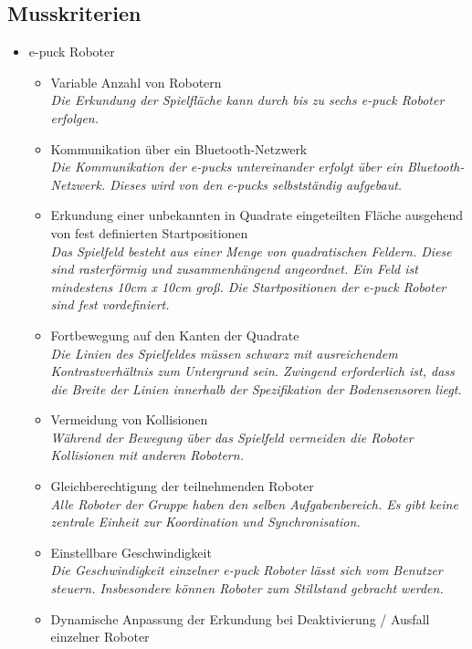 \documentclass[10pt,a4paper]{article}
\begin{document}
		\subsection{Musskriterien}
			\begin{itemize}
				\item e-puck Roboter
				\begin{itemize}
					\item Variable Anzahl von Robotern
						\\ \textsl{Die Erkundung der Spielfläche kann durch bis zu sechs e-puck Roboter erfolgen.}
					\item Kommunikation über ein Bluetooth-Netzwerk
						\\ \textsl{Die Kommunikation der e-pucks untereinander erfolgt über ein Bluetooth-Netzwerk.
						   Dieses wird von den e-pucks selbstständig aufgebaut.}
					\item Erkundung einer unbekannten in Quadrate eingeteilten Fläche ausgehend von fest definierten Startpositionen
						\\ \textsl{Das Spielfeld besteht aus einer Menge von quadratischen \gls{Feld}ern. Diese sind rasterförmig
							und zusammenhängend angeordnet. Ein Feld ist mindestens 10cm x 10cm groß. Die Startpositionen der e-puck Roboter
						   sind fest vordefiniert.}
					\item Fortbewegung auf den Kanten der Quadrate
						\\ \textsl{Die Linien des Spielfeldes müssen schwarz mit ausreichendem Kontrastverhältnis
						    zum Untergrund sein. Zwingend erforderlich ist, dass die Breite der Linien innerhalb der Spezifikation der
							Bodensensoren liegt.}		
					\item Vermeidung von Kollisionen
						\\ \textsl{Während der Bewegung über das Spielfeld vermeiden die Roboter Kollisionen mit anderen Robotern.}	
					\item Gleichberechtigung der teilnehmenden Roboter
						\\ \textsl{Alle Roboter der Gruppe haben den selben Aufgabenbereich. Es gibt keine zentrale Einheit
							zur Koordination und Synchronisation.}	
					\item Einstellbare Geschwindigkeit
						\\ \textsl{Die Geschwindigkeit einzelner e-puck Roboter lässt sich vom Benutzer steuern. Insbesondere können Roboter
							zum Stillstand gebracht werden.}
					\item Dynamische Anpassung der Erkundung bei Deaktivierung / Ausfall einzelner Roboter

\end{itemize}
\end{itemize}
\end{document}
